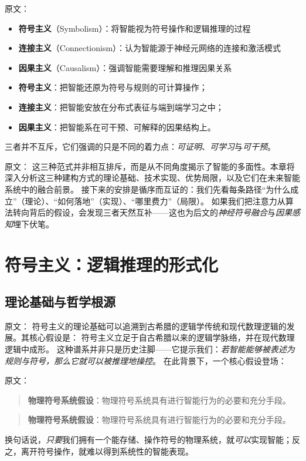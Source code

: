 原文：
\begin{itemize}
\item \textbf{符号主义}（Symbolism）：将智能视为符号操作和逻辑推理的过程
\item \textbf{连接主义}（Connectionism）：认为智能源于神经元网络的连接和激活模式
\item \textbf{因果主义}（Causalism）：强调智能需要理解和推理因果关系
\end{itemize}
\begin{itemize}
\item \textbf{符号主义}：把智能还原为符号与规则的可计算操作；
\item \textbf{连接主义}：把智能安放在分布式表征与端到端学习之中；
\item \textbf{因果主义}：把智能系在可干预、可解释的因果结构上。
\end{itemize}
三者并不互斥，它们强调的只是不同的着力点：\emph{可证明}、\emph{可学习}与\emph{可干预}。

原文：
这三种范式并非相互排斥，而是从不同角度揭示了智能的多面性。本章将深入分析这三种建构方式的理论基础、技术实现、优势局限，以及它们在未来智能系统中的融合前景。
接下来的安排是循序而互证的：我们先看每条路径“为什么成立”（理论）、“如何落地”（实现）、“哪里费力”（局限）。  
如果我们把注意力从算法转向背后的假设，会发现三者天然互补——这也为后文的\emph{神经符号融合}与\emph{因果感知}埋下伏笔。


\section{符号主义：逻辑推理的形式化}

\subsection{理论基础与哲学根源}

原文：
符号主义的理论基础可以追溯到古希腊的逻辑学传统和现代数理逻辑的发展。其核心假设是：
符号主义立足于自古希腊以来的逻辑学脉络，并在现代数理逻辑中成形。  
这种谱系并非只是历史注脚——它提示我们：\emph{若智能能够被表述为规则与符号，那么它就可以被推理地操控}。  
在此背景下，一个核心假设登场：

原文：
\begin{quote}
\textbf{物理符号系统假设}：物理符号系统具有进行智能行为的必要和充分手段。
\end{quote}
\begin{quote}
\textbf{物理符号系统假设}：物理符号系统具有进行智能行为的必要和充分手段。
\end{quote}
换句话说，\emph{只要}我们拥有一个能存储、操作符号的物理系统，就\emph{可以}实现智能；反之，离开符号操作，就难以得到系统性的智能表现。

